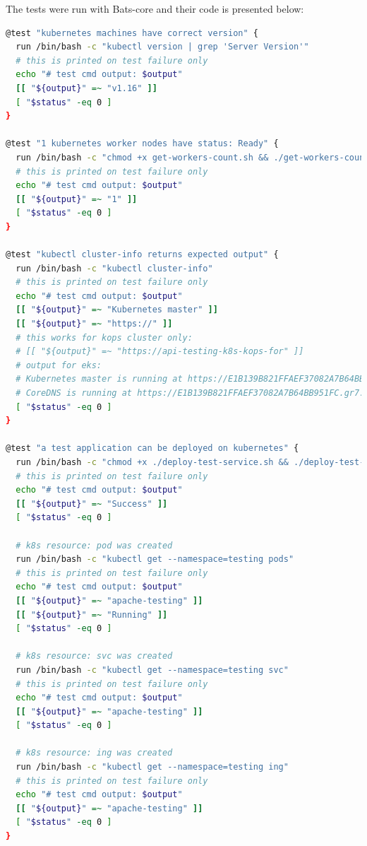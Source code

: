 The tests were run with Bats-core and their code is presented below:
\begin{lstlisting}[basicstyle=\tiny,caption={TODO},captionpos=b,language=Bash,xleftmargin=1cm]
@test "kubernetes machines have correct version" {
  run /bin/bash -c "kubectl version | grep 'Server Version'"
  # this is printed on test failure only
  echo "# test cmd output: $output"
  [[ "${output}" =~ "v1.16" ]]
  [ "$status" -eq 0 ]
}

@test "1 kubernetes worker nodes have status: Ready" {
  run /bin/bash -c "chmod +x get-workers-count.sh && ./get-workers-count.sh"
  # this is printed on test failure only
  echo "# test cmd output: $output"
  [[ "${output}" =~ "1" ]]
  [ "$status" -eq 0 ]
}

@test "kubectl cluster-info returns expected output" {
  run /bin/bash -c "kubectl cluster-info"
  # this is printed on test failure only
  echo "# test cmd output: $output"
  [[ "${output}" =~ "Kubernetes master" ]]
  [[ "${output}" =~ "https://" ]]
  # this works for kops cluster only:
  # [[ "${output}" =~ "https://api-testing-k8s-kops-for" ]]
  # output for eks:
  # Kubernetes master is running at https://E1B139B821FFAEF37082A7B64BB951FC.gr7.eu-west-1.eks.amazonaws.com
  # CoreDNS is running at https://E1B139B821FFAEF37082A7B64BB951FC.gr7.eu-west-1.eks.amazonaws.com/api/v1/namespaces/kube-system/services/kube-dns:dns/proxy
  [ "$status" -eq 0 ]
}

@test "a test application can be deployed on kubernetes" {
  run /bin/bash -c "chmod +x ./deploy-test-service.sh && ./deploy-test-service.sh"
  # this is printed on test failure only
  echo "# test cmd output: $output"
  [[ "${output}" =~ "Success" ]]
  [ "$status" -eq 0 ]

  # k8s resource: pod was created
  run /bin/bash -c "kubectl get --namespace=testing pods"
  # this is printed on test failure only
  echo "# test cmd output: $output"
  [[ "${output}" =~ "apache-testing" ]]
  [[ "${output}" =~ "Running" ]]
  [ "$status" -eq 0 ]

  # k8s resource: svc was created
  run /bin/bash -c "kubectl get --namespace=testing svc"
  # this is printed on test failure only
  echo "# test cmd output: $output"
  [[ "${output}" =~ "apache-testing" ]]
  [ "$status" -eq 0 ]

  # k8s resource: ing was created
  run /bin/bash -c "kubectl get --namespace=testing ing"
  # this is printed on test failure only
  echo "# test cmd output: $output"
  [[ "${output}" =~ "apache-testing" ]]
  [ "$status" -eq 0 ]
}


\end{lstlisting}
